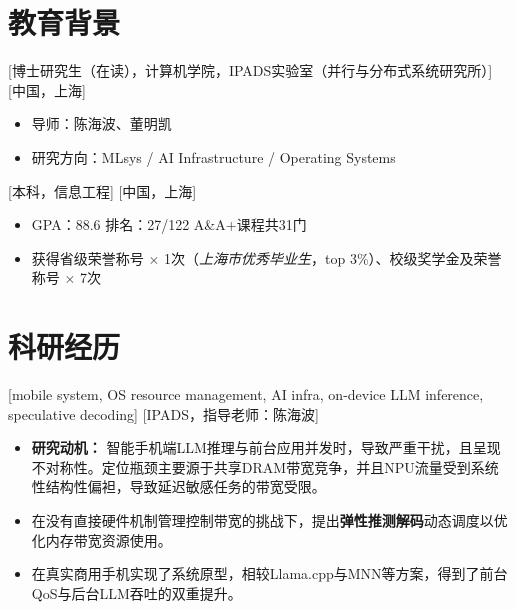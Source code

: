 \documentclass{chicv}
\begin{document}
\begin{basicinfo}
\end{basicinfo}

\section{教育背景}
[博士研究生（在读），计算机学院，IPADS实验室（并行与分布式系统研究所）]
[中国，上海]
\begin{itemize}
  \item 导师：陈海波、董明凯
  \item 研究方向：MLsys / AI Infrastructure / Operating Systems
\end{itemize}

[本科，信息工程]
[中国，上海]
\begin{itemize}
  \item GPA：88.6 \quad{} 排名：27/122 \quad{}A\&A+课程共31门
  \item 获得省级荣誉称号 $\times$ 1次（\textit{上海市优秀毕业生}，top 3\%）、校级奖学金及荣誉称号 $\times$ 7次

\end{itemize}

\section{科研经历}

[mobile system, OS resource management, AI infra, on-device LLM inference, speculative decoding]
[IPADS，指导老师：陈海波]
\begin{itemize}
  \item \textbf{研究动机：} 智能手机端LLM推理与前台应用并发时，导致严重干扰，且呈现不对称性。定位瓶颈主要源于共享DRAM带宽竞争，并且NPU流量受到系统性结构性偏袒，导致延迟敏感任务的带宽受限。
  \item 在没有直接硬件机制管理控制带宽的挑战下，提出\textbf{弹性推测解码}动态调度以优化内存带宽资源使用。
  \item 在真实商用手机实现了系统原型，相较Llama.cpp与MNN等方案，得到了前台QoS与后台LLM吞吐的双重提升。
\end{itemize}
\end{document}
